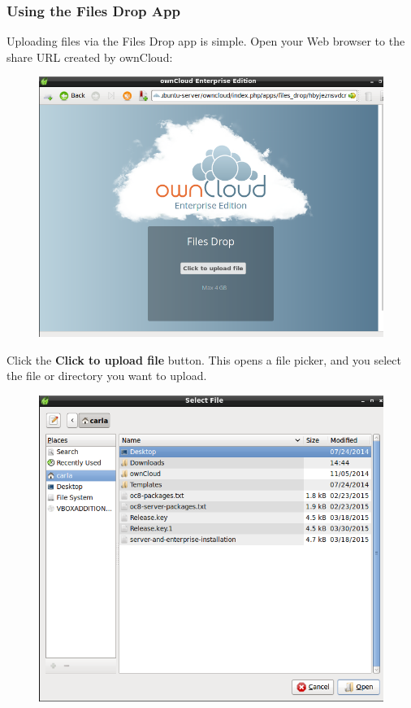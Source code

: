 \documentclass[letterpaper,10pt,english]{sphinxmanual}
\begin{document}
\subsubsection{Using the Files Drop App}
\label{enterprise_file_management/files_drop:using-the-files-drop-app}
Uploading files via the Files Drop app is simple. Open your Web browser to the
share URL created by ownCloud:
\begin{figure}[htbp]
\centering

\includegraphics{files-drop-5.png}
\end{figure}

Click the \textbf{Click to upload file} button. This opens a file picker, and you
select the file or directory you want to upload.
\begin{figure}[htbp]
\centering

\includegraphics{files-drop-6.png}
\end{figure}
\end{document}
